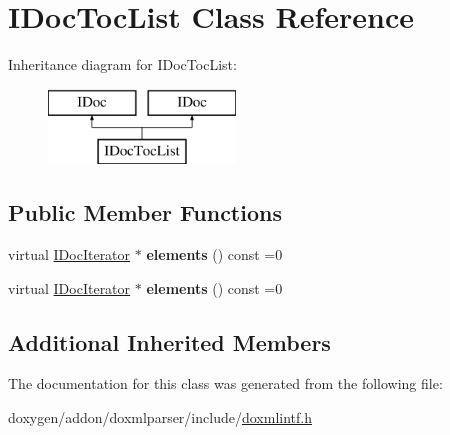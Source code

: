 \hypertarget{class_i_doc_toc_list}{}\section{I\+Doc\+Toc\+List Class Reference}
\label{class_i_doc_toc_list}
Inheritance diagram for I\+Doc\+Toc\+List\+:\begin{figure}[H]
\begin{center}
\leavevmode
\includegraphics[height=2.000000cm]{class_i_doc_toc_list}
\end{center}
\end{figure}
\subsection*{Public Member Functions}
\begin{DoxyCompactItemize}
\item 
\mbox{\label{class_i_doc_toc_list_a614ff64f1618cd6edbdbfe221cf3863e}} 
virtual \mbox{\hyperlink{class_i_doc_iterator}{I\+Doc\+Iterator}} $\ast$ {\bfseries elements} () const =0
\item 
\mbox{\label{class_i_doc_toc_list_a614ff64f1618cd6edbdbfe221cf3863e}} 
virtual \mbox{\hyperlink{class_i_doc_iterator}{I\+Doc\+Iterator}} $\ast$ {\bfseries elements} () const =0
\end{DoxyCompactItemize}
\subsection*{Additional Inherited Members}


The documentation for this class was generated from the following file\+:\begin{DoxyCompactItemize}
\item 
doxygen/addon/doxmlparser/include/\mbox{\hyperlink{include_2doxmlintf_8h}{doxmlintf.\+h}}\end{DoxyCompactItemize}
